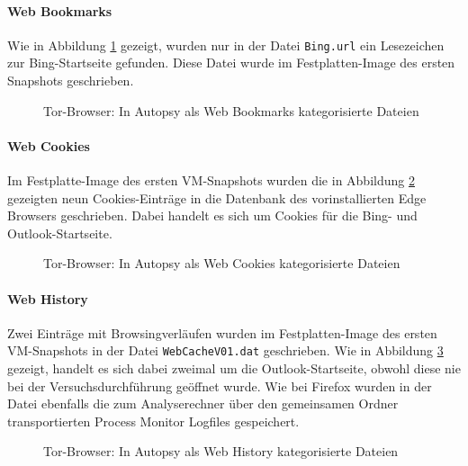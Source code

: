 \begin{appendices}
\paragraph*{Web Bookmarks}
Wie in Abbildung \ref{img:tor-web-bookmarks} gezeigt, wurden nur in der Datei \texttt{Bing.url} ein Lesezeichen zur Bing-Startseite gefunden. Diese Datei wurde im Festplatten-Image des ersten Snapshots geschrieben.
\begin{figure}[h!]
	\centerline{} 
	\caption{Tor-Browser: In Autopsy als \glqq{}Web Bookmarks\grqq{} kategorisierte Dateien}
	\label{img:tor-web-bookmarks} 
\end{figure}

\paragraph*{Web Cookies}
Im Festplatte-Image des ersten VM-Snapshots wurden die in Abbildung \ref{img:tor-web-cookies} gezeigten neun Cookies-Einträge in die Datenbank des vorinstallierten Edge Browsers geschrieben. Dabei handelt es sich um Cookies für die Bing- und Outlook-Startseite.
\begin{figure}[h!]
	\centerline{} 
	\caption{Tor-Browser: In Autopsy als \glqq{}Web Cookies\grqq{} kategorisierte Dateien}
	\label{img:tor-web-cookies} 
\end{figure}

\paragraph*{Web History}
Zwei Einträge mit Browsingverläufen wurden im Festplatten-Image des ersten VM-Snapshots in der Datei \texttt{WebCacheV01.dat} geschrieben. Wie in Abbildung \ref{img:tor-web-history} gezeigt, handelt es sich dabei zweimal um die Outlook-Startseite, obwohl diese nie bei der Versuchsdurchführung geöffnet wurde. Wie bei Firefox wurden in der Datei ebenfalls die zum Analyserechner über den gemeinsamen Ordner transportierten Process Monitor Logfiles gespeichert.
\begin{figure}[h!]
	\centerline{}
	\caption{Tor-Browser: In Autopsy als \glqq{}Web History\grqq{} kategorisierte Dateien}
	\label{img:tor-web-history}  
\end{figure}


\end{appendices}
